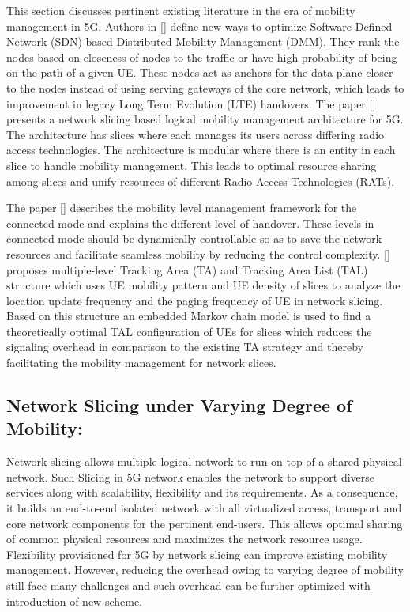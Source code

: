 \begin{multicols}{2}
This section discusses pertinent existing literature in the era of mobility management in 5G. Authors in [\cite{art1-key03}] define new ways to optimize Software-Defined Network (SDN)-based Distributed Mobility Management (DMM). They rank the nodes based on closeness of nodes to the traffic or have high probability of being on the path of a given UE. These nodes act as anchors for the data plane closer to the nodes instead of using serving gateways of the core network, which leads to  improvement in legacy Long Term Evolution (LTE) handovers.  The paper [\cite{art1-key04}] presents a network slicing based logical mobility management architecture for 5G. The architecture has slices where each manages its users across differing radio access technologies. The architecture is modular where there is an entity in each slice to handle mobility management. This leads to optimal resource sharing among slices and unify resources of different Radio Access Technologies (RATs).

The paper [\cite{art1-key05}] describes the mobility level management framework for the connected mode and explains the different level of handover. These levels in connected mode should be dynamically controllable so as to save the network resources and facilitate seamless mobility by reducing the control complexity.  [\cite{art1-key06}] proposes multiple-level Tracking Area (TA) and Tracking  Area List (TAL) structure which uses UE mobility pattern  and UE density of slices to analyze the location update  frequency and the paging frequency of UE in network slicing.  Based on this structure an embedded Markov chain model is used to find a theoretically optimal TAL configuration of UEs  for slices which reduces the signaling overhead in comparison  to the existing TA strategy and thereby facilitating the mobility  management for network slices.

\subsection{Network Slicing under Varying Degree of Mobility:}

Network slicing allows multiple logical network to run on top of a shared physical network. Such Slicing in 5G network enables the network to support diverse services along with scalability, flexibility and its requirements. As a consequence, it builds an end-to-end isolated network with all virtualized access, transport and core network components for the pertinent end-users. This allows optimal sharing of common physical resources and maximizes the network resource usage. Flexibility provisioned for 5G by network slicing can improve existing mobility management. However, reducing the overhead owing to varying degree of mobility still face many challenges and such overhead can be further optimized with introduction of new scheme.


\end{multicols}
